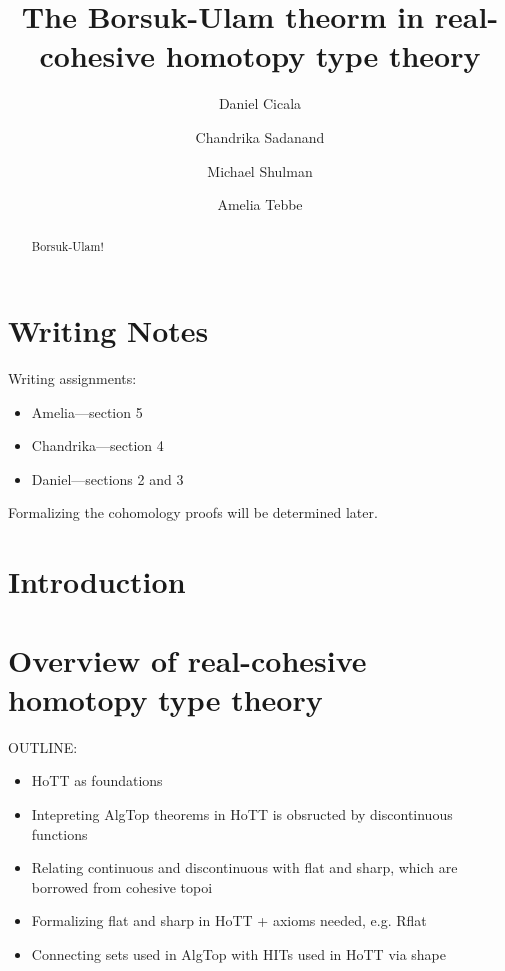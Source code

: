 \documentclass{amsart}
\begin{document}
\title{%
        The Borsuk-Ulam theorm in real-cohesive homotopy
        type theory}   
\author{%
        Daniel Cicala \and Chandrika Sadanand \and Michael
        Shulman \and Amelia Tebbe}
\begin{abstract}
        Borsuk-Ulam!
\end{abstract}
\maketitle

\section*{Writing Notes}
\label{sec:writing_notes}

Writing assignments:
\begin{itemize}
\item Amelia---section 5
\item Chandrika---section 4
\item Daniel---sections 2 and 3
\end{itemize}

Formalizing the cohomology proofs will be determined later.


\section{Introduction}
\label{sec:intro}

\section{Overview of real-cohesive homotopy type theory}
\label{sec:rc-hott}

OUTLINE:
\begin{itemize}
\item
  HoTT as foundations
\item
  Intepreting AlgTop theorems in HoTT is obsructed by
  discontinuous functions
\item
  Relating continuous and discontinuous with flat and
  sharp, which are borrowed from cohesive topoi
\item
  Formalizing flat and sharp in HoTT + axioms needed,
  e.g. Rflat
\item
  Connecting sets used in AlgTop with HITs used in HoTT
  via shape
\end{itemize}
\end{document}
